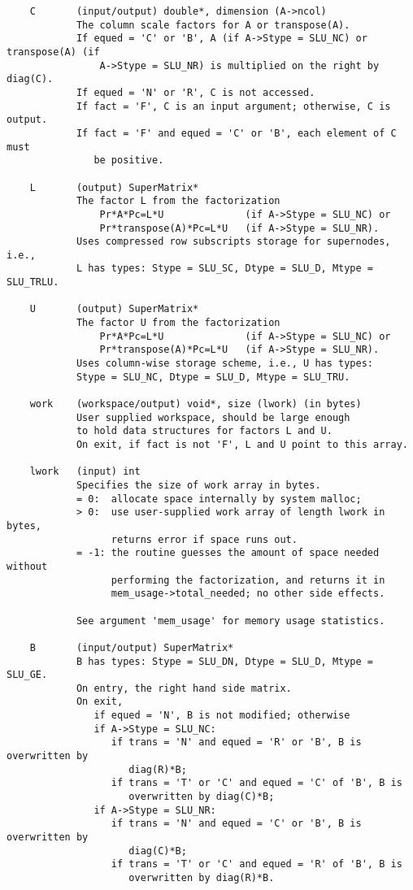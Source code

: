\begin{verbatim}
    C       (input/output) double*, dimension (A->ncol)
            The column scale factors for A or transpose(A).
            If equed = 'C' or 'B', A (if A->Stype = SLU_NC) or transpose(A) (if 
                A->Stype = SLU_NR) is multiplied on the right by diag(C).
            If equed = 'N' or 'R', C is not accessed.
            If fact = 'F', C is an input argument; otherwise, C is output.
            If fact = 'F' and equed = 'C' or 'B', each element of C must
               be positive.
            
    L       (output) SuperMatrix*
            The factor L from the factorization
                Pr*A*Pc=L*U              (if A->Stype = SLU_NC) or
                Pr*transpose(A)*Pc=L*U   (if A->Stype = SLU_NR).
            Uses compressed row subscripts storage for supernodes, i.e.,
            L has types: Stype = SLU_SC, Dtype = SLU_D, Mtype = SLU_TRLU.
   
    U       (output) SuperMatrix*
            The factor U from the factorization
                Pr*A*Pc=L*U              (if A->Stype = SLU_NC) or
                Pr*transpose(A)*Pc=L*U   (if A->Stype = SLU_NR).
            Uses column-wise storage scheme, i.e., U has types:
            Stype = SLU_NC, Dtype = SLU_D, Mtype = SLU_TRU.
   
    work    (workspace/output) void*, size (lwork) (in bytes)
            User supplied workspace, should be large enough
            to hold data structures for factors L and U.
            On exit, if fact is not 'F', L and U point to this array.
   
    lwork   (input) int
            Specifies the size of work array in bytes.
            = 0:  allocate space internally by system malloc;
            > 0:  use user-supplied work array of length lwork in bytes,
                  returns error if space runs out.
            = -1: the routine guesses the amount of space needed without
                  performing the factorization, and returns it in
                  mem_usage->total_needed; no other side effects.
   
            See argument 'mem_usage' for memory usage statistics.
   
    B       (input/output) SuperMatrix*
            B has types: Stype = SLU_DN, Dtype = SLU_D, Mtype = SLU_GE.
            On entry, the right hand side matrix.
            On exit,
               if equed = 'N', B is not modified; otherwise
               if A->Stype = SLU_NC:
                  if trans = 'N' and equed = 'R' or 'B', B is overwritten by
                     diag(R)*B;
                  if trans = 'T' or 'C' and equed = 'C' of 'B', B is
                     overwritten by diag(C)*B;
               if A->Stype = SLU_NR:
                  if trans = 'N' and equed = 'C' or 'B', B is overwritten by
                     diag(C)*B;
                  if trans = 'T' or 'C' and equed = 'R' of 'B', B is
                     overwritten by diag(R)*B.
   

\end{verbatim}
